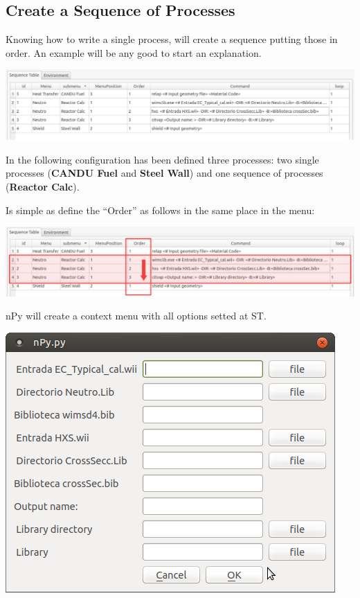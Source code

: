 \documentclass[a4paper,10pt]{article}
\begin{document}
\subsection{Create a Sequence of Processes}

Knowing how to write a single process, will create a sequence putting those in order. An example will be any good to start an explanation. 

\begin{center}
 \includegraphics[width=\textwidth]{img/orderingSequence.png}
\end{center}

In the following configuration has been defined three processes: two single processes (\textbf{CANDU Fuel} and \textbf{Steel Wall}) and one sequence of processes (\textbf{Reactor Calc}).

Is simple as define the ``Order'' as follows in the same place in the menu:

\begin{center}
 \includegraphics[width=\textwidth]{img/orderingSequenceMark.png}
\end{center}

nPy will create a context menu with all options setted at ST.

\begin{center}
 \includegraphics[width=\textwidth]{img/orderingSequenceContextMenu.png}
\end{center}
\end{document}
